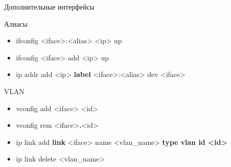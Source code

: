 
\begin{frame}{Дополнительные интерфейсы}
	\begin{block}{Алиасы}
		\begin{itemize}
			\item ifconfig <iface>:<alias> <ip> up
			\item ifconfig <iface> add <ip> up
			\item ip addr add <ip> {\bf label} <iface>:<alias> dev <iface>
		\end{itemize}
	\end{block}
	\pause
	\begin{block}{VLAN}
		\begin{itemize}
			\item vconfig add <iface> <id>
			\item vconfig rem <iface>{\bf.}<id>
			\item ip link add {\bf link} <iface> name <vlan\_name> {\bf type vlan id <id>}
			\item ip link delete <vlan\_name>
		\end{itemize}
	\end{block}

\end{frame}


